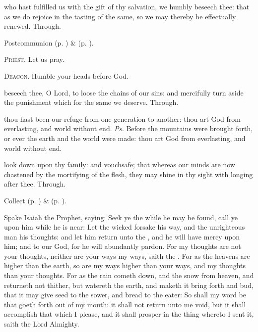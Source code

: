 
\postcommunion
{} who hast fulfilled us with the gift of thy salvation, we humbly beseech thee: that as we do rejoice in the tasting of the same, so we may thereby be effectually renewed. Through.
\begin{rubric}
     Postcommunion  (p. \pageref{AshWednesdayMassPostcommunion}) \&   (p. \pageref{SPLivingDeparted}).
\end{rubric}

\textsc{Priest.} Let us pray.\par
\textsc{Deacon.} Humble your heads before God.\par
{} beseech thee, O Lord, to loose the chains of our sins: and mercifully turn aside the punishment which for the same we deserve. Through.



\introit
{} thou hast been our refuge from one generation to another: thou art God from everlasting, and world without end. \textit{Ps.} Before the mountains were brought forth, or ever the earth and the world were made: thou art God from everlasting, and world without end.

\collect
{} look down upon thy family: and vouchsafe; that whereas our minds are now chastened by the mortifying of the flesh, they may shine in thy sight with longing after thee. Through.
\begin{rubric}
     Collect  (p. \pageref{AshWednesdayMassCollect}) \&   (p. \pageref{SPLivingDeparted}).
\end{rubric}

 Spake Isaiah the Prophet, saying: Seek ye the  while he may be found, call ye upon him while he is near: Let the wicked forsake his way, and the unrighteous man his thoughts: and let him return unto the , and he will have mercy upon him; and to our God, for he will abundantly pardon. For my thoughts are not your thoughts, neither are your ways my ways, saith the . For as the heavens are higher than the earth, so are my ways higher than your ways, and my thoughts than your thoughts. For as the rain cometh down, and the snow from heaven, and returneth not thither, but watereth the earth, and maketh it bring forth and bud, that it may give seed to the sower, and bread to the eater: So shall my word be that goeth forth out of my mouth: it shall not return unto me void, but it shall accomplish that which I please, and it shall prosper in the thing whereto I sent it, saith the Lord Almighty.


